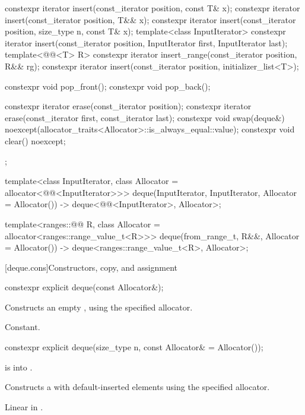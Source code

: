 \begin{codeblock}
{{    constexpr iterator insert(const_iterator position, const T& x);
    constexpr iterator insert(const_iterator position, T&& x);
    constexpr iterator insert(const_iterator position, size_type n, const T& x);
    template<class InputIterator>
      constexpr iterator insert(const_iterator position,
                                InputIterator first, InputIterator last);
    template<@@<T> R>
      constexpr iterator insert_range(const_iterator position, R&& rg);
    constexpr iterator insert(const_iterator position, initializer_list<T>);

    constexpr void pop_front();
    constexpr void pop_back();

    constexpr iterator erase(const_iterator position);
    constexpr iterator erase(const_iterator first, const_iterator last);
    constexpr void     swap(deque&)
      noexcept(allocator_traits<Allocator>::is_always_equal::value);
    constexpr void     clear() noexcept;
  };

  template<class InputIterator, class Allocator = allocator<@@<InputIterator>>>
    deque(InputIterator, InputIterator, Allocator = Allocator())
      -> deque<@@<InputIterator>, Allocator>;

  template<ranges::@@ R, class Allocator = allocator<ranges::range_value_t<R>>>
    deque(from_range_t, R&&, Allocator = Allocator())
      -> deque<ranges::range_value_t<R>, Allocator>;
}
\end{codeblock}

[deque.cons]{Constructors, copy, and assignment}

%
\begin{itemdecl}
constexpr explicit deque(const Allocator&);
\end{itemdecl}

\begin{itemdescr}
\pnum
\effects
Constructs an empty
,
using the specified allocator.

\pnum
\complexity
Constant.
\end{itemdescr}

%
\begin{itemdecl}
constexpr explicit deque(size_type n, const Allocator& = Allocator());
\end{itemdecl}

\begin{itemdescr}
\pnum
\expects
{} is  into .

\pnum
\effects
Constructs a  with
 default-inserted elements using the specified allocator.

\pnum
\complexity
Linear in .
\end{itemdescr}

